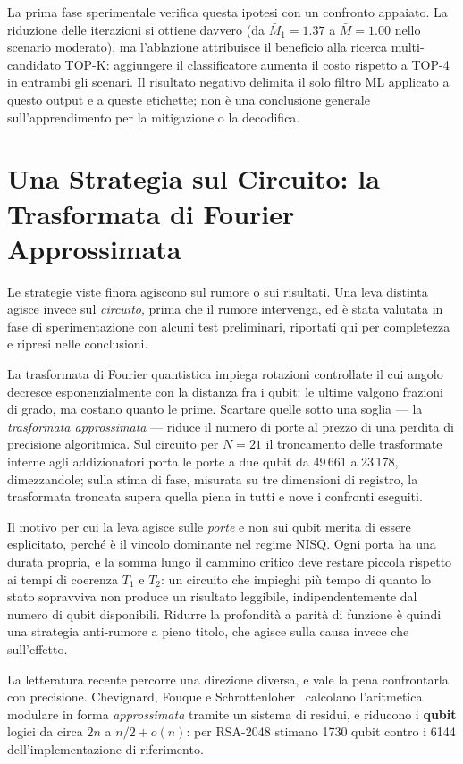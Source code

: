 \begin{onehalfspace}
La prima fase sperimentale verifica questa ipotesi con un confronto appaiato. La riduzione delle iterazioni si ottiene davvero (da $\bar{M}_1=1.37$ a $\bar{M}=1.00$ nello scenario moderato), ma l'ablazione attribuisce il beneficio alla ricerca multi-candidato TOP-K: aggiungere il classificatore aumenta il costo rispetto a TOP-4 in entrambi gli scenari. Il risultato negativo delimita il solo filtro \ac{ML} applicato a questo output e a queste etichette; non è una conclusione generale sull'apprendimento per la mitigazione o la decodifica.

\section{Una Strategia sul Circuito: la Trasformata di Fourier Approssimata}
\label{sec:aqft_strategia}

Le strategie viste finora agiscono sul rumore o sui risultati. Una leva distinta agisce
invece sul \emph{circuito}, prima che il rumore intervenga, ed è stata valutata in fase
di sperimentazione con alcuni test preliminari, riportati qui per completezza e ripresi
nelle conclusioni.

La trasformata di Fourier quantistica impiega rotazioni controllate il cui angolo decresce
esponenzialmente con la distanza fra i qubit: le ultime valgono frazioni di grado, ma
costano quanto le prime. Scartare quelle sotto una soglia --- la \emph{trasformata
approssimata} --- riduce il numero di porte al prezzo di una perdita di precisione
algoritmica. Sul circuito per $N=21$ il troncamento delle trasformate interne agli
addizionatori porta le porte a due qubit da 49\,661 a 23\,178, dimezzandole; sulla stima
di fase, misurata su tre dimensioni di registro, la trasformata troncata supera quella
piena in tutti e nove i confronti eseguiti.

Il motivo per cui la leva agisce sulle \emph{porte} e non sui qubit merita di essere
esplicitato, perché è il vincolo dominante nel regime \ac{NISQ}. Ogni porta ha una durata
propria, e la somma lungo il cammino critico deve restare piccola rispetto ai tempi di
coerenza $T_1$ e $T_2$: un circuito che impieghi più tempo di quanto lo stato sopravviva
non produce un risultato leggibile, indipendentemente dal numero di qubit disponibili.
Ridurre la profondità a parità di funzione è quindi una strategia anti-rumore a pieno
titolo, che agisce sulla causa invece che sull'effetto.

La letteratura recente percorre una direzione diversa, e vale la pena confrontarla con
precisione. Chevignard, Fouque e Schrottenloher~\cite{chevignard2025} calcolano
l'aritmetica modulare in forma \emph{approssimata} tramite un sistema di residui, e
riducono i \textbf{qubit} logici da circa $2n$ a $n/2 + o(n)$: per RSA-2048 stimano 1730
qubit contro i 6144 dell'implementazione di riferimento.


\end{onehalfspace}
